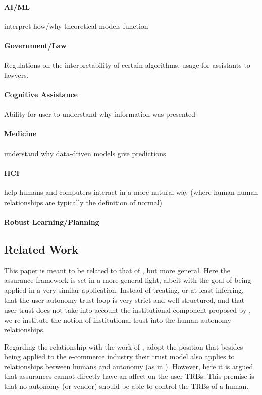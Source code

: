     \paragraph{AI/ML} interpret how/why theoretical models function
    \paragraph{Government/Law} Regulations on the interpretability of certain algorithms, usage for assistants to lawyers.
    \paragraph{Cognitive Assistance} Ability for user to understand why information was presented
    \paragraph{Medicine} understand why data-driven models give predictions
    \paragraph{HCI} help humans and computers interact in a more natural way (where human-human relationships are typically the definition of normal)
    \paragraph{Robust Learning/Planning}

\subsection{Related Work}
    This paper is meant to be related to that of \citet{Lillard2016-yg}, but more general. Here the assurance framework is set in a more general light, albeit with the goal of being applied in a very similar application. Instead of treating, or at least inferring, that the user-autonomy trust loop is very strict and well structured, and that user trust does not take into account the institutional component proposed by \citet{McKnight2001-fa}, we re-institute the notion of institutional trust into the human-autonomy relationships.

    Regarding the relationship with the work of \citet{McKnight2001-fa}, adopt the position that besides being applied to the e-commerce industry their trust model also applies to relationships between humans and autonomy (as in \citet{Lillard2016-yg}). However, here it is argued that assurances cannot directly have an affect on the user TRBs. This premise is that no autonomy (or vendor) should be able to control the TRBs of a human.






